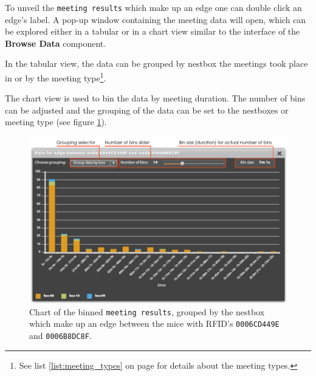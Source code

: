 To unveil the \lstinline|meeting results| which make up an edge one can double click an edge's label. A pop-up window containing the meeting data will open, which can be explored either in a tabular or in a chart view similar to the interface of the \textbf{Browse Data} component.

In the tabular view, the data can be grouped by nestbox the meetings took place in or by the meeting type\footnote{See list \ref{list:meeting_types} on page \pageref{list:meeting_types} for details about the meeting types.}.

The chart view is used to bin the data by meeting duration. The number of bins can be adjusted and the grouping of the data can be set to the nestboxes or meeting type (see figure \ref{fig:edge_data_panel_chart}).

\begin{figure}[!htpb]
\begin{center}
  \includegraphics[width=\textwidth]{assets/pdf/edge_data_panel_chart.pdf}
  \caption[Edge data chart]{Chart of the binned \lstinline|meeting results|, grouped by the nestbox which make up an edge between the mice with RFID's \lstinline|0006CD449E| and \lstinline|0006B8DC8F|.}
  \label{fig:edge_data_panel_chart}
\end{center}
\end{figure}   
